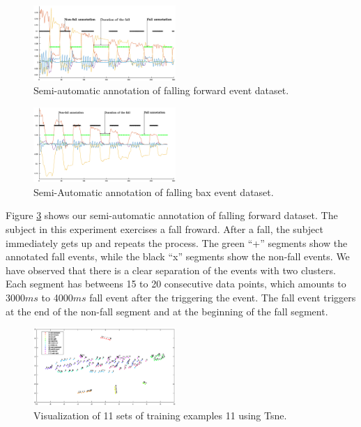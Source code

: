 \documentclass{IEEEtran}
\begin{document}
\begin{figure}[!htb]
\centering
\includegraphics[width=0.48\textwidth]{plots/human_falling_forward2.eps} 
\caption{Semi-automatic annotation of falling forward event dataset.}
 \label{fig:automatic_annotation} 
\end{figure}


\begin{figure}[!htb]
\centering
\includegraphics[width=0.48\textwidth]{plots/human_falling_backward2.eps} 
\caption{Semi-Automatic annotation of falling bax event dataset.}
 \label{fig:automatic_annotation2} 
\end{figure}







Figure \ref{fig:automatic_annotation} shows our semi-automatic annotation of falling 
forward dataset. The subject in this experiment exercises a fall froward. After a 
fall, the subject immediately gets up and repeats the process. The green ``+'' segments 
show the annotated fall events, while the black ``x'' segments show the non-fall 
events. We have observed that there is a clear separation of the events with two 
clusters. Each segment has betweens 15 to 20 consecutive data points, which amounts to 
3000$ms$ to 4000$ms$ fall event after the triggering the event. The fall event triggers 
at the end of the non-fall segment and at the beginning of the fall segment.

\begin{figure}[!htb]
\centering
\includegraphics[width=0.48\textwidth]{figures/viz_all_training_examples.eps} 
\caption{Visualization of 11 sets of training examples 11 using Tsne.}
 \label{fig:automatic_annotation} 
\end{figure}
\end{document}

